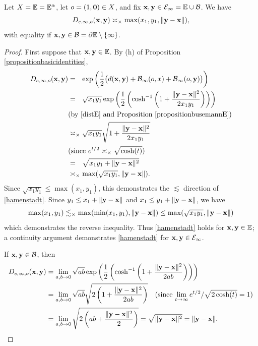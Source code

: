 \begin{proposition}
\label{propositionhamenstadt}
Let $X = \E = \E^\alpha$, let $o = (1,\mathbf 0)\in X$, and fix $\xx,\yy\in \EE_\infty = \E\cup\BB$. We have
\begin{equation}
\label{hamenstadt}
D_{e,\infty,o}(\mathbf x,\mathbf y) \asymp_\times \max(x_1,y_1,\|\mathbf y - \mathbf x\|),
\end{equation}
with equality if $\xx,\yy\in\BB = \del\E\butnot\{\infty\}$.
\end{proposition}
\begin{proof}
First suppose that $\xx,\yy\in\E$. By (h) of Proposition \ref{propositionbasicidentities},
\begin{align*}
\Dist_{e,\infty,\zero}(\xx,\yy)
&=_\pt \exp\left(\frac12\big(\dist(\xx,\yy) + \busemann_\infty(\zero,x) + \busemann_\infty(\zero,\yy)\big)\right)\\
&=_\pt \sqrt{x_1 y_1} \exp\left(\frac12\left(\cosh^{-1}\left(1 + \frac{\|\yy - \xx\|^2}{2 x_1 y_1}\right)\right)\right)\\ 
\by{\eqref{distE} and Proposition \ref{propositionbusemannE}}\\
&\asymp_\times \sqrt{x_1 y_1} \sqrt{1 + \frac{\|\yy - \xx\|^2}{2 x_1 y_1}}\\ 
\since{$e^{t/2} \asymp_\times \sqrt{\cosh(t)}$}\\
&=_\pt \sqrt{x_1 y_1 + \|\yy - \xx\|^2}\\
&\asymp_\times \max(\sqrt{x_1 y_1}, \|\yy - \xx\|).
\end{align*}
Since $\sqrt{x_1 y_1}\leq \max(x_1,y_1)$, this demonstrates the $\lesssim$ direction of \eqref{hamenstadt}. Since $y_1 \leq x_1 + \|\mathbf y - \mathbf x\|$ and $x_1 \leq y_1 + \|\mathbf y - \mathbf x\|$, we have
\[
\max(x_1,y_1) \lesssim_\times \max(\min(x_1,y_1),\|\mathbf y - \mathbf x\|) \leq \max(\sqrt{x_1 y_1}, \|\mathbf y - \mathbf x\|)
\]
which demonstrates the reverse inequality. Thus \eqref{hamenstadt} holds for $\xx,\yy\in\E$; a continuity argument demonstrates \eqref{hamenstadt} for $\mathbf x,\mathbf y\in\mathcal E_\infty$.

If $\mathbf x,\mathbf y\in\mathcal B$, then
\begin{align*}
\Dist_{e,\infty,\zero}(\xx,\yy)
&= \lim_{a,b\to 0} \sqrt{a b} \exp\left(\frac12\left(\cosh^{-1}\left(1 + \frac{\|\yy - \xx\|^2}{2 a b}\right)\right)\right) \noreason\\
&= \lim_{a,b\to 0} \sqrt{a b} \sqrt{2\left(1 + \frac{\|\yy - \xx\|^2}{2 a b}\right)} \since{$\lim_{t\to\infty} e^{t/2}/\sqrt{2\cosh(t)} = 1$}\\
&= \lim_{a,b\to 0} \sqrt{2\left(ab + \frac{\|\yy - \xx\|^2}{2}\right)} = \sqrt{\|\yy - \xx\|^2} = \|\yy - \xx\|.\noreason
\end{align*}
\end{proof}

